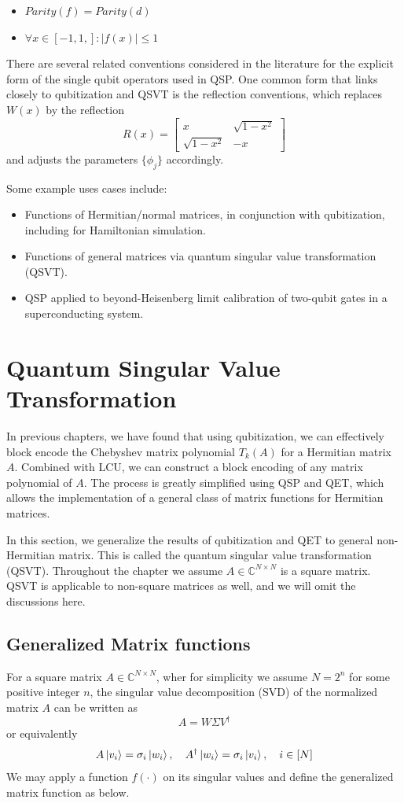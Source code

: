 \documentclass[12pt, oneside]{book}
\theoremstyle{definition}
\theoremstyle{definition}
\theoremstyle{remark}
\begin{document}
\begin{importantnote}
\begin{itemize}
        \item $Parity(f)=Parity(d)$
        \item $\forall x \in [-1,1,]:|f(x)|\leq 1$
    \end{itemize}
    There are several related conventions considered in the literature for the explicit form of the single qubit operators used in QSP. One common form that links closely to qubitization and QSVT is the reflection conventions, which replaces $W(x)$ by the reflection
    \[
    R(x)=\begin{bmatrix} x & \sqrt{1-x^2}\\
    \sqrt{1-x^2} & -x \end{bmatrix}
    \]
    and adjusts the parameters $\{\phi_j\}$ accordingly.
\end{importantnote}
Some example uses cases include:
\begin{itemize}
    \item Functions of Hermitian/normal matrices, in conjunction with qubitization, including for Hamiltonian simulation.
    \item Functions of general matrices via quantum singular value transformation (QSVT).
    \item QSP applied to beyond-Heisenberg limit calibration of two-qubit gates in a superconducting system.
\end{itemize}
\chapter{Quantum Singular Value Transformation}
In previous chapters, we have found that using qubitization, we can effectively block encode the Chebyshev matrix polynomial $T_k(A)$ for a Hermitian matrix $A$. Combined with LCU, we can construct a block encoding of any matrix polynomial of $A$. The process is greatly simplified using QSP and QET, which allows the implementation of a general class of matrix functions for Hermitian matrices. 

In this section, we generalize the results of qubitization and QET to general non-Hermitian matrix. This is called the quantum singular value transformation (QSVT). Throughout the chapter we assume $A \in \mathbb{C}^{N\times N}$ is a square matrix. QSVT is applicable to non-square matrices as well, and we will omit the discussions here.

\section{Generalized Matrix functions}
For a square matrix $A \in \mathbb{C}^{N\times N}$, wher for simplicity we assume $N=2^n$ for some positive integer $n$, the singular value decomposition (SVD) of the normalized matrix $A$ can be written as
\[
A=W\Sigma V^{\dagger}
\]
or equivalently
\[
A\ket{v_i} = \sigma_i \ket{w_i}, \quad A^{\dagger}\ket{w_i}=\sigma_i\ket{v_i}, \quad i \in [N]
\]
We may apply a function $f(\cdot)$ on its singular values and define the generalized matrix function as below.
\end{document}
